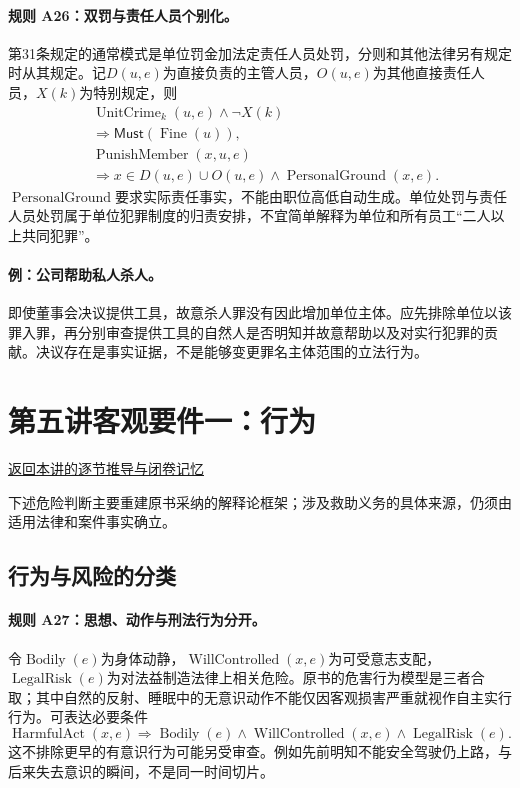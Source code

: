 \paragraph{规则 A26：双罚与责任人员个别化。}
第31条规定的通常模式是单位罚金加法定责任人员处罚，分则和其他法律另有规定时从其规定。记$D(u,e)$为直接负责的主管人员，$O(u,e)$为其他直接责任人员，$X(k)$为特别规定，则
\[
\begin{aligned}
&\operatorname{UnitCrime}_k(u,e)\land\neg X(k)\\
&\Longrightarrow\mathsf{Must}(\operatorname{Fine}(u)),\\
&\operatorname{PunishMember}(x,u,e)\\
&\Longrightarrow x\in D(u,e)\cup O(u,e)
\land\operatorname{PersonalGround}(x,e).
\end{aligned}
\]
$\operatorname{PersonalGround}$要求实际责任事实，不能由职位高低自动生成。单位处罚与责任人员处罚属于单位犯罪制度的归责安排，不宜简单解释为单位和所有员工“二人以上共同犯罪”。

\paragraph{例：公司帮助私人杀人。}
即使董事会决议提供工具，故意杀人罪没有因此增加单位主体。应先排除单位以该罪入罪，再分别审查提供工具的自然人是否明知并故意帮助以及对实行犯罪的贡献。决议存在是事实证据，不是能够变更罪名主体范围的立法行为。

\section{第五讲\quad 客观要件一：行为}

\label{ref:lecture:05}

\noindent\hyperref[lecture:05]{返回本讲的逐节推导与闭卷记忆}

下述危险判断主要重建原书采纳的解释论框架；涉及救助义务的具体来源，仍须由适用法律和案件事实确立。

\subsection{行为与风险的分类}
\paragraph{规则 A27：思想、动作与刑法行为分开。}
令$\operatorname{Bodily}(e)$为身体动静，$\operatorname{WillControlled}(x,e)$为可受意志支配，$\operatorname{LegalRisk}(e)$为对法益制造法律上相关危险。原书的危害行为模型是三者合取；其中自然的反射、睡眠中的无意识动作不能仅因客观损害严重就视作自主实行行为。可表达必要条件
\[
\operatorname{HarmfulAct}(x,e)
\Longrightarrow\operatorname{Bodily}(e)
\land\operatorname{WillControlled}(x,e)
\land\operatorname{LegalRisk}(e).
\]
这不排除更早的有意识行为可能另受审查。例如先前明知不能安全驾驶仍上路，与后来失去意识的瞬间，不是同一时间切片。

